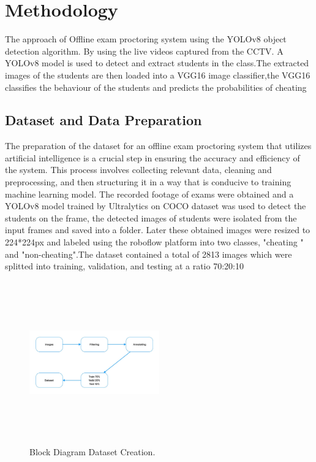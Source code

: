 \documentclass[conference]{IEEEtran}
\begin{document}
\section{Methodology}
The approach of Offline exam proctoring system using the YOLOv8 object detection algorithm. By using the live videos captured from the CCTV. A YOLOv8 model is used to detect and extract students in the class.The extracted images of the students are then loaded into a VGG16 image classifier,the VGG16 classifies the behaviour of the students and predicts the probabilities of cheating 

\subsection{Dataset and Data Preparation}\label{AA}
The preparation of the dataset for an offline exam proctoring system that utilizes artificial intelligence is a crucial step in ensuring the accuracy and efficiency of the system. This process involves collecting relevant data, cleaning and preprocessing, and then structuring it in a way that is conducive to training machine learning model. The recorded footage of exams were obtained and a YOLOv8 model trained by Ultralytics on COCO dataset was used to detect the students on the frame, the detected images of students were isolated from the input frames and saved into a folder. Later these obtained images were resized to 224*224px and labeled using the roboflow platform into two classes, "cheating " and "non-cheating".The dataset contained a total of 2813 images which were splitted into training, validation, and testing at a ratio 70:20:10 

\usepackage{graphicx} %

\begin{figure}[htbp]
\centering
\includegraphics[width=0.5\textwidth, height=7cm]{images/block.jpeg}  %
\caption{Block Diagram Dataset Creation.}
\label{fig}
\end{figure}
\end{document}
